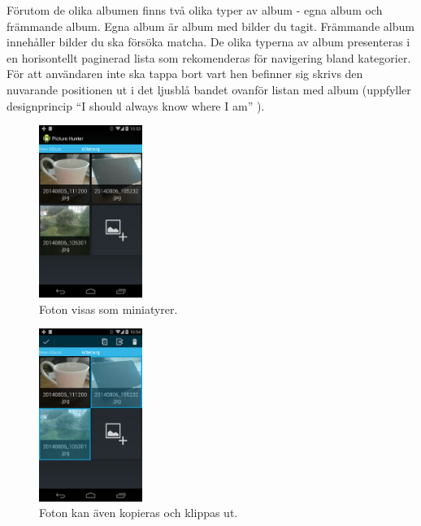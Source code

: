 \documentclass[11px, a4paper, twocolumn]{article}
\begin{document}
	Förutom de olika albumen finns två olika typer av album - egna album och främmande album. Egna album är album med bilder du tagit. Främmande album innehåller bilder du ska försöka matcha. De olika typerna av album presenteras i en horisontellt paginerad lista som rekomenderas för navigering bland kategorier\cite{HorizontalPaging}. För att användaren inte ska tappa bort vart hen befinner sig skrivs den nuvarande positionen ut i det ljusblå bandet ovanför listan med album (uppfyller designprincip ``I should always know where I am''\cite{Principles} ).


	\begin{figure}[p]
		\centering
	    \includegraphics[width=0.3\textwidth]{img/photos}
		\caption{\label{fig:photos}Foton visas som miniatyrer.}
	\end{figure}

	\begin{figure}[p]
		\centering
	    \includegraphics[width=0.3\textwidth]{img/photos_selection}
		\caption{\label{fig:photos_selection}Foton kan även kopieras och klippas ut.}
	\end{figure}
\end{document}
